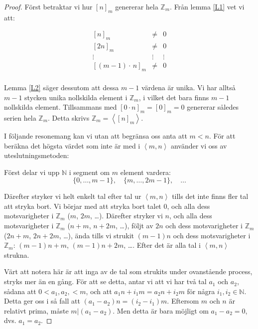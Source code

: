 \begin{proof}
Först betraktar vi hur $[n]_m$ genererar hela $\mathbb{Z}_m$. Från lemma \ref{L1} vet vi att:

\begin{equation*}
\begin{array}{rcc}
[n]_m & \neq & 0 \\
\left[2n\right]_m & \neq & 0 \\
\vdots \quad & \vdots & \vdots \\
\left[(m - 1) \cdot \, n\right]_m & \neq & 0 \\
\end{array}
\end{equation*}

Lemma \ref{L2} säger dessutom att dessa $m - 1$ värdena är unika. Vi har alltså
$m-1$ stycken unika nollskilda element i $\mathbb{Z}_m$, i vilket det bara finns $m-1$ nollskilda element. Tillsammans med $[0 \cdot n]_m=[0]_m=0$ genererar således serien hela $\mathbb{Z}_m$. Detta skrivs $\mathbb{Z}_m = \left< [n]_m \right>$.

I följande resonemang kan vi utan att begränsa oss anta att $m < n$. För att beräkna det högsta värdet som inte är med i $\left<m, n\right>$ använder vi oss av uteslutningsmetoden:

Först delar vi upp $\mathbb{N}$ i segment om $m$ element vardera:
\[\{0, \ldots, m - 1\}, \quad \{m, \ldots, 2m - 1\}, \quad \ldots\]

Därefter stryker vi helt enkelt tal efter tal ur $\left<m,n\right>$ tills det inte finns fler tal att stryka bort. Vi börjar med att stryka bort talet $0$, och alla dess motsvarigheter i $\mathbb{Z}_m$ ($m$, $2m$, \ldots). Därefter stryker vi $n$, och alla dess motsvarigheter i $\mathbb{Z}_m$ ($n + m$, $n + 2m$, \ldots), följt av $2n$ och dess motsvarigheter i $\mathbb{Z}_m$ ($2n + m$, $2n + 2m$, \ldots), ända tills vi strukit $(m-1)n$ och dess motsvarigheter i $\mathbb{Z}_m$: $(m - 1)n + m$, $(m - 1)n + 2m$, \ldots. Efter det är alla tal i $\left<m,n\right>$ strukna.

Värt att notera här är att inga av de tal som strukits under ovanstående process, stryks mer än en gång. För att se detta, antar vi att vi har två tal $a_1$ och $a_2$, sådana att $0 < a_1, a_2, < m$, och att $a_1 n + i_1 m = a_2 n + i_2 m$ för några $i_1, i_2 \in \mathbb{N}$. Detta ger oss i så fall att $(a_1-a_2)n = (i_2-i_1)m$. Eftersom $m$ och $n$ är relativt prima, måste $m \vert (a_1-a_2)$. Men detta är bara möjligt om $a_1-a_2=0$, dvs. $a_1=a_2$.


\end{proof}

